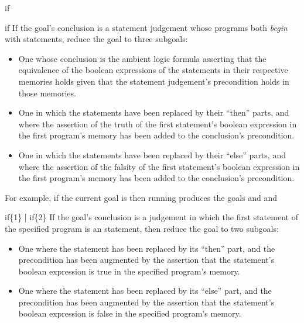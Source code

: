 \begin{tactic}{if}
  \begin{tsyntax}{if}
  If the goal's conclusion is a \prhl statement judgement whose programs
  both \emph{begin} with  statements, reduce the goal to
  three subgoals:
  \begin{itemize}
  \item One whose conclusion is the ambient logic formula asserting that
    the equivalence of the boolean expressions of the  statements
    in their respective memories holds given that the statement judgement's
    precondition holds in those memories.

  \item One in which the  statements have been replaced by
    their ``then'' parts, and where the assertion of the truth of
    the first  statement's boolean expression in the first
    program's memory has been added to the conclusion's precondition.

  \item One in which the  statements have been replaced by
    their ``else'' parts, and where the assertion of the falsity of
    the first  statement's boolean expression in the first
    program's memory has been added to the conclusion's precondition.
  \end{itemize}

  \bigskip
  For example, if the current goal is
   then
  running 
  produces the goals
  and
  and
  \end{tsyntax}

  \begin{tsyntax}{if\{1\} | if\{2\}}
    If the goal's conclusion is a \prhl judgement in which the first
    statement of the specified program is an  statement,
    then reduce the goal to two subgoals:
    \begin{itemize}
    \item One where the  statement has been replaced by its
      ``then'' part, and the precondition has been augmented by the
      assertion that the  statement's boolean expression is true
      in the specified program's memory.

    \item One where the  statement has been replaced by its
      ``else'' part, and the precondition has been augmented by the
      assertion that the  statement's boolean expression is false
      in the specified program's memory.
    \end{itemize}


\end{tsyntax}
\end{tactic}
